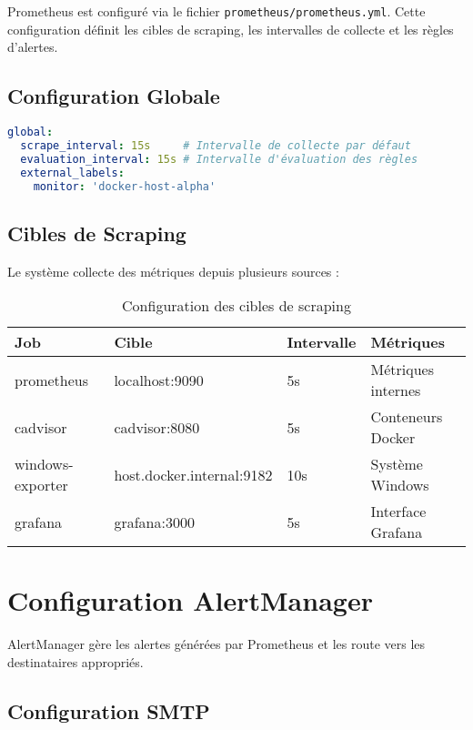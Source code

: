 \documentclass[12pt,a4paper]{report}
\newcommand{\file}[1]{\texttt{\color{secondaryblue}#1}}
\begin{document}
Prometheus est configuré via le fichier \file{prometheus/prometheus.yml}. Cette configuration définit les cibles de scraping, les intervalles de collecte et les règles d'alertes.

\subsection{Configuration Globale}

\begin{lstlisting}[language=yaml, caption=Configuration globale Prometheus]
global:
  scrape_interval: 15s     # Intervalle de collecte par défaut
  evaluation_interval: 15s # Intervalle d'évaluation des règles
  external_labels:
    monitor: 'docker-host-alpha'
\end{lstlisting}

\subsection{Cibles de Scraping}

Le système collecte des métriques depuis plusieurs sources :

\begin{table}[H]
\centering
\begin{tabular}{|l|l|l|l|}
\hline
\textbf{Job} & \textbf{Cible} & \textbf{Intervalle} & \textbf{Métriques} \\
\hline
prometheus & localhost:9090 & 5s & Métriques internes \\
\hline
cadvisor & cadvisor:8080 & 5s & Conteneurs Docker \\
\hline
windows-exporter & host.docker.internal:9182 & 10s & Système Windows \\
\hline
grafana & grafana:3000 & 5s & Interface Grafana \\
\hline
\end{tabular}
\caption{Configuration des cibles de scraping}
\label{tab:scraping-targets}
\end{table}

\section{Configuration AlertManager}

AlertManager gère les alertes générées par Prometheus et les route vers les destinataires appropriés.

\subsection{Configuration SMTP}
\end{document}
